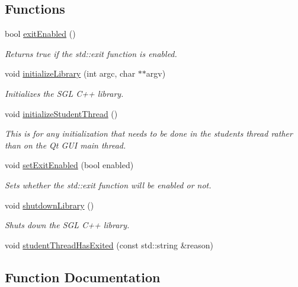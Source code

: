 \subsection*{Functions}
\begin{DoxyCompactItemize}
\item 
bool \mbox{\hyperlink{namespacesgl_a5bb1fbda6b82680cc8f04064e55a85c6}{exit\+Enabled}} ()
\begin{DoxyCompactList}\small\item\em Returns true if the std\+::exit function is enabled. \end{DoxyCompactList}\item 
void \mbox{\hyperlink{namespacesgl_ab36f2e19ed11765f2b025cc8e4636010}{initialize\+Library}} (int argc, char $\ast$$\ast$argv)
\begin{DoxyCompactList}\small\item\em Initializes the S\+GL C++ library. \end{DoxyCompactList}\item 
void \mbox{\hyperlink{namespacesgl_aa826ed0038c35ea532e22c6c0a4e6036}{initialize\+Student\+Thread}} ()
\begin{DoxyCompactList}\small\item\em This is for any initialization that needs to be done in the student\textquotesingle{}s thread rather than on the Qt G\+UI main thread. \end{DoxyCompactList}\item 
void \mbox{\hyperlink{namespacesgl_afa57f85846177bb4ed2b4b12fa8a758d}{set\+Exit\+Enabled}} (bool enabled)
\begin{DoxyCompactList}\small\item\em Sets whether the std\+::exit function will be enabled or not. \end{DoxyCompactList}\item 
void \mbox{\hyperlink{namespacesgl_a2937cb1c4385064875d0cb29fcdfeae6}{shutdown\+Library}} ()
\begin{DoxyCompactList}\small\item\em Shuts down the S\+GL C++ library. \end{DoxyCompactList}\item 
void \mbox{\hyperlink{namespacesgl_ad119146bad8508df277e3f629d26284d}{student\+Thread\+Has\+Exited}} (const std\+::string \&reason)
\end{DoxyCompactItemize}


\subsection{Function Documentation}
\mbox{\label{namespacesgl_a5bb1fbda6b82680cc8f04064e55a85c6}} 
